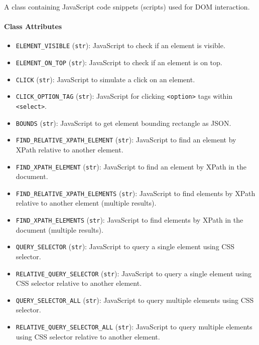 \documentclass{article}
\begin{document}
\noindent A class containing JavaScript code snippets (scripts) used for DOM interaction.

\paragraph{Class Attributes}

\begin{itemize}
    \item \lstinline[style=pythonstyle]|ELEMENT_VISIBLE| (\lstinline[style=pythonstyle]|str|): JavaScript to check if an element is visible.
    \item \lstinline[style=pythonstyle]|ELEMENT_ON_TOP| (\lstinline[style=pythonstyle]|str|): JavaScript to check if an element is on top.
    \item \lstinline[style=pythonstyle]|CLICK| (\lstinline[style=pythonstyle]|str|): JavaScript to simulate a click on an element.
    \item \lstinline[style=pythonstyle]|CLICK_OPTION_TAG| (\lstinline[style=pythonstyle]|str|): JavaScript for clicking \lstinline[style=pythonstyle]|<option>| tags within \lstinline[style=pythonstyle]|<select>|.
    \item \lstinline[style=pythonstyle]|BOUNDS| (\lstinline[style=pythonstyle]|str|): JavaScript to get element bounding rectangle as JSON.
    \item \lstinline[style=pythonstyle]|FIND_RELATIVE_XPATH_ELEMENT| (\lstinline[style=pythonstyle]|str|): JavaScript to find an element by XPath relative to another element.
    \item \lstinline[style=pythonstyle]|FIND_XPATH_ELEMENT| (\lstinline[style=pythonstyle]|str|): JavaScript to find an element by XPath in the document.
    \item \lstinline[style=pythonstyle]|FIND_RELATIVE_XPATH_ELEMENTS| (\lstinline[style=pythonstyle]|str|): JavaScript to find elements by XPath relative to another element (multiple results).
    \item \lstinline[style=pythonstyle]|FIND_XPATH_ELEMENTS| (\lstinline[style=pythonstyle]|str|): JavaScript to find elements by XPath in the document (multiple results).
    \item \lstinline[style=pythonstyle]|QUERY_SELECTOR| (\lstinline[style=pythonstyle]|str|): JavaScript to query a single element using CSS selector.
    \item \lstinline[style=pythonstyle]|RELATIVE_QUERY_SELECTOR| (\lstinline[style=pythonstyle]|str|): JavaScript to query a single element using CSS selector relative to another element.
    \item \lstinline[style=pythonstyle]|QUERY_SELECTOR_ALL| (\lstinline[style=pythonstyle]|str|): JavaScript to query multiple elements using CSS selector.
    \item \lstinline[style=pythonstyle]|RELATIVE_QUERY_SELECTOR_ALL| (\lstinline[style=pythonstyle]|str|): JavaScript to query multiple elements using CSS selector relative to another element.
\end{itemize}
\end{document}
